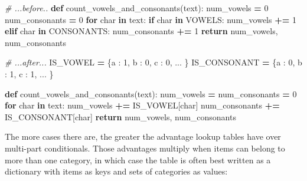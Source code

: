 \documentclass[
]{krantz}
\makeatletter
\newenvironment{Shaded}{\begin{snugshade}}{\end{snugshade}}
\newcommand{\CommentTok}[1]{\textcolor[rgb]{0.56,0.35,0.01}{\textit{#1}}}
\newcommand{\ControlFlowTok}[1]{\textcolor[rgb]{0.13,0.29,0.53}{\textbf{#1}}}
\newcommand{\DecValTok}[1]{\textcolor[rgb]{0.00,0.00,0.81}{#1}}
\newcommand{\KeywordTok}[1]{\textcolor[rgb]{0.13,0.29,0.53}{\textbf{#1}}}
\newcommand{\NormalTok}[1]{#1}
\newcommand{\OperatorTok}[1]{\textcolor[rgb]{0.81,0.36,0.00}{\textbf{#1}}}
\newcommand{\StringTok}[1]{\textcolor[rgb]{0.31,0.60,0.02}{#1}}
\newenvironment{kframe}{%
\medskip{}
\setlength{\fboxsep}{.8em}
 \def\at@end@of@kframe{}%
 \ifinner\ifhmode%
  \def\at@end@of@kframe{\end{minipage}}%
  \begin{minipage}{\columnwidth}%
 \fi\fi%
 \def\FrameCommand##1{\hskip\@totalleftmargin \hskip-\fboxsep
 \colorbox{shadecolor}{##1}\hskip-\fboxsep
     \hskip-\linewidth \hskip-\@totalleftmargin \hskip\columnwidth}%
 \MakeFramed {\advance\hsize-\width
   \@totalleftmargin\z@ \linewidth\hsize
   \@setminipage}}%
 {\par\unskip\endMakeFramed%
 \at@end@of@kframe}
\renewenvironment{Shaded}{\begin{kframe}}{\end{kframe}}
\makeatother
\begin{document}
\begin{Shaded}
\begin{Highlighting}[]
\CommentTok{\# ...before..}
\KeywordTok{def}\NormalTok{ count\_vowels\_and\_consonants(text):}
\NormalTok{    num\_vowels }\OperatorTok{=} \DecValTok{0}
\NormalTok{    num\_consonants }\OperatorTok{=} \DecValTok{0}
    \ControlFlowTok{for}\NormalTok{ char }\KeywordTok{in}\NormalTok{ text:}
        \ControlFlowTok{if}\NormalTok{ char }\KeywordTok{in}\NormalTok{ VOWELS:}
\NormalTok{            num\_vowels }\OperatorTok{+=} \DecValTok{1}
        \ControlFlowTok{elif}\NormalTok{ char }\KeywordTok{in}\NormalTok{ CONSONANTS:}
\NormalTok{            num\_consonants }\OperatorTok{+=} \DecValTok{1}
    \ControlFlowTok{return}\NormalTok{ num\_vowels, num\_consonants}
\end{Highlighting}
\end{Shaded}

\begin{Shaded}
\begin{Highlighting}[]
\CommentTok{\# ...after...}
\NormalTok{IS\_VOWEL }\OperatorTok{=}\NormalTok{ \{}\StringTok{\textquotesingle{}a\textquotesingle{}}\NormalTok{ : }\DecValTok{1}\NormalTok{, }\StringTok{\textquotesingle{}b\textquotesingle{}}\NormalTok{ : }\DecValTok{0}\NormalTok{, }\StringTok{\textquotesingle{}c\textquotesingle{}}\NormalTok{ : }\DecValTok{0}\NormalTok{, ... \}}
\NormalTok{IS\_CONSONANT }\OperatorTok{=}\NormalTok{ \{}\StringTok{\textquotesingle{}a\textquotesingle{}}\NormalTok{ : }\DecValTok{0}\NormalTok{, }\StringTok{\textquotesingle{}b\textquotesingle{}}\NormalTok{ : }\DecValTok{1}\NormalTok{, }\StringTok{\textquotesingle{}c\textquotesingle{}}\NormalTok{ : }\DecValTok{1}\NormalTok{, ... \}}

\KeywordTok{def}\NormalTok{ count\_vowels\_and\_consonants(text):}
\NormalTok{    num\_vowels }\OperatorTok{=}\NormalTok{ num\_consonants }\OperatorTok{=} \DecValTok{0}
    \ControlFlowTok{for}\NormalTok{ char }\KeywordTok{in}\NormalTok{ text:}
\NormalTok{        num\_vowels }\OperatorTok{+=}\NormalTok{ IS\_VOWEL[char]}
\NormalTok{        num\_consonants }\OperatorTok{+=}\NormalTok{ IS\_CONSONANT[char]}
    \ControlFlowTok{return}\NormalTok{ num\_vowels, num\_consonants}
\end{Highlighting}
\end{Shaded}

The more cases there are,
the greater the advantage lookup tables have over multi-part conditionals.
Those advantages multiply when items can belong to more than one category,
in which case the table is often best written as a dictionary with items as keys
and sets of categories as values:
\end{document}
